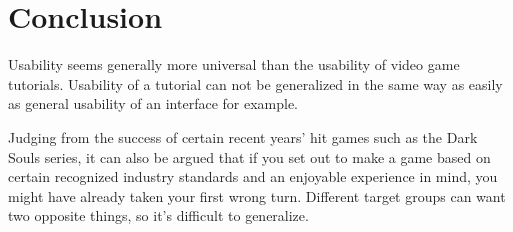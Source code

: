 \chapter{Conclusion}
Usability seems generally more universal than the usability of video game tutorials. Usability of a tutorial can not be generalized in the same way as easily as general usability of an interface for example.

Judging from the success of certain recent years' hit games such as the Dark Souls series, it can also be argued that if you set out to make a game based on certain recognized industry standards and an enjoyable experience in mind, you might have already taken your first wrong turn. Different target groups can want two opposite things, so it's difficult to generalize.
